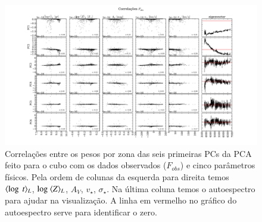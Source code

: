\begin{figure}
    \includegraphics[width=1.2\textwidth, angle=-90]{figuras/K0277-correl-f_obs-PCvsPhys.pdf}
	\caption[Correlações PCs vs. par\^ametros f\'isicos - $F_{obs}$.]
    {Correlações entre os pesos por zona das seis primeiras PCs da PCA feito para o cubo com os dados observados
    ($F_{obs}$) e cinco parâmetros físicos. Pela ordem de colunas da esquerda para direita temos $\meanL{\log\
    t}$, $\log\ \meanL{Z}$, $A_V$, $v_{\star}$, $\sigma_{\star}$. Na última coluna temos o autoespectro para ajudar na
    visualização. A linha em vermelho no gráfico do autoespectro serve para identificar o zero.}
    \label{fig:K0277correfobs}
\end{figure}

